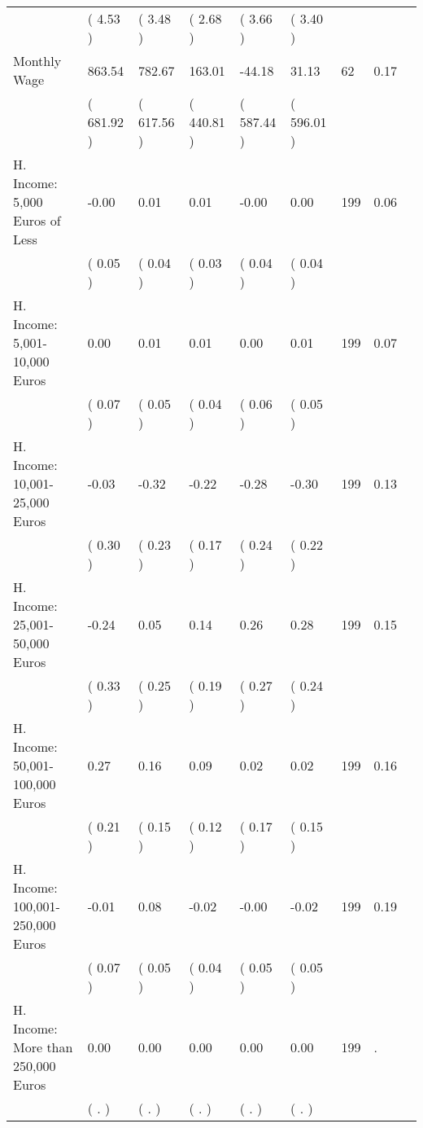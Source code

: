 \begin{tabular}{L{6.2cm} C{1.8cm} C{1.8cm} C{1.8cm} C{1.8cm} C{1.8cm} C{1.8cm} C{0.3cm} C{0.3cm}}
 & (     4.53 ) & (     3.48 ) & (     2.68 ) & (     3.66 ) & (     3.40 )  & \\
Monthly Wage &    863.54 &    782.67 &    163.01 &    -44.18 &     31.13  & 62 &       0.17 \\ 
 & (   681.92 ) & (   617.56 ) & (   440.81 ) & (   587.44 ) & (   596.01 )  & \\
H. Income: 5,000 Euros of Less &     -0.00 &      0.01 &      0.01 &     -0.00 &      0.00  & 199 &       0.06 \\ 
 & (     0.05 ) & (     0.04 ) & (     0.03 ) & (     0.04 ) & (     0.04 )  & \\
H. Income: 5,001-10,000 Euros &      0.00 &      0.01 &      0.01 &      0.00 &      0.01  & 199 &       0.07 \\ 
 & (     0.07 ) & (     0.05 ) & (     0.04 ) & (     0.06 ) & (     0.05 )  & \\
H. Income: 10,001-25,000 Euros &     -0.03 &     -0.32 &     -0.22 &     -0.28 &     -0.30  & 199 &       0.13 \\ 
 & (     0.30 ) & (     0.23 ) & (     0.17 ) & (     0.24 ) & (     0.22 )  & \\
H. Income: 25,001-50,000 Euros &     -0.24 &      0.05 &      0.14 &      0.26 &      0.28  & 199 &       0.15 \\ 
 & (     0.33 ) & (     0.25 ) & (     0.19 ) & (     0.27 ) & (     0.24 )  & \\
H. Income: 50,001-100,000 Euros &      0.27 &      0.16 &      0.09 &      0.02 &      0.02  & 199 &       0.16 \\ 
 & (     0.21 ) & (     0.15 ) & (     0.12 ) & (     0.17 ) & (     0.15 )  & \\
H. Income: 100,001-250,000 Euros &     -0.01 &      0.08 &     -0.02 &     -0.00 &     -0.02  & 199 &       0.19 \\ 
 & (     0.07 ) & (     0.05 ) & (     0.04 ) & (     0.05 ) & (     0.05 )  & \\
H. Income: More than 250,000 Euros &      0.00 &      0.00 &      0.00 &      0.00 &      0.00  & 199 &          . \\ 
 & (        . ) & (        . ) & (        . ) & (        . ) & (        . )  & \\
\bottomrule
\end{tabular}
